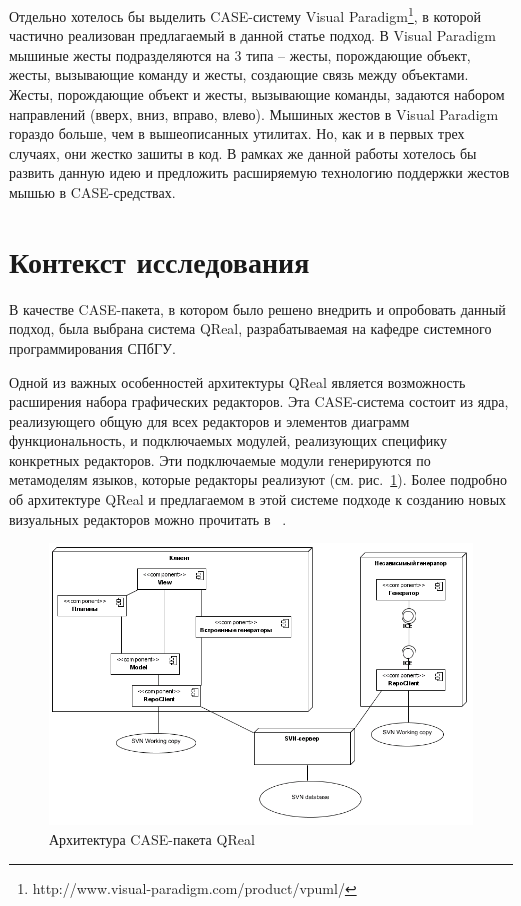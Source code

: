 \documentclass[a5paper]{article}
\begin{document}
Отдельно хотелось бы выделить CASE-систему Visual Paradigm\footnote{http://www.visual-paradigm.com/product/vpuml/}, в которой частично реализован предлагаемый в данной статье подход. 
В Visual Paradigm мышиные жесты подразделяются на 3 типа – жесты, порождающие объект, жесты, вызывающие команду и жесты, 
создающие связь между объектами. Жесты, порождающие объект и жесты, вызывающие команды, задаются набором направлений (вверх, вниз, вправо, влево). 
Мышиных жестов в Visual Paradigm гораздо больше, чем в вышеописанных утилитах. Но, как и в первых трех случаях, они жестко
зашиты в код. В рамках же данной работы хотелось бы развить данную идею и предложить расширяемую технологию поддержки
жестов мышью в CASE-средствах.



\section{Контекст исследования}
В качестве CASE-пакета, в котором было решено внедрить и опробовать данный подход, была выбрана система QReal, разрабатываемая на кафедре 
системного программирования СПбГУ. 

Одной из важных особенностей архитектуры QReal является возможность расширения набора графических редакторов. Эта CASE-система состоит 
из ядра, реализующего общую для всех редакторов и элементов диаграмм функциональность, и подключаемых модулей, реализующих специфику 
конкретных редакторов. Эти подключаемые модули генерируются по метамоделям языков, которые редакторы реализуют (см. рис.~\ref{architecture}). 
Более подробно об архитектуре QReal и предлагаемом в этой системе подходе к  созданию новых визуальных редакторов можно прочитать в ~\cite{qreal}. 

\begin{figure} [ht]
  \begin{center}
    \includegraphics[width=1\textwidth, bb=0 0 798 531]{01-architecture.png}
    \caption{Архитектура CASE-пакета QReal}
    \label{architecture}
  \end{center}
\end{figure}
\end{document}
